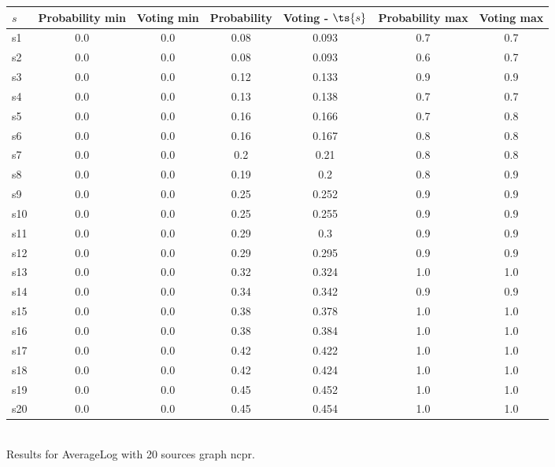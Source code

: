 \documentclass{article}
\begin{document}
\noindent\begin{tabular}{|l|c|c|c|c|c|c|}
\hline
$s$& Probability min & Voting min & Probability & Voting - $\ts{s}$ & Probability max & Voting max\\
\hline
s1 &0.0 & 0.0 & 0.08 & 0.093 & 0.7 & 0.7\\
\hline
s2 &0.0 & 0.0 & 0.08 & 0.093 & 0.6 & 0.7\\
\hline
s3 &0.0 & 0.0 & 0.12 & 0.133 & 0.9 & 0.9\\
\hline
s4 &0.0 & 0.0 & 0.13 & 0.138 & 0.7 & 0.7\\
\hline
s5 &0.0 & 0.0 & 0.16 & 0.166 & 0.7 & 0.8\\
\hline
s6 &0.0 & 0.0 & 0.16 & 0.167 & 0.8 & 0.8\\
\hline
s7 &0.0 & 0.0 & 0.2 & 0.21 & 0.8 & 0.8\\
\hline
s8 &0.0 & 0.0 & 0.19 & 0.2 & 0.8 & 0.9\\
\hline
s9 &0.0 & 0.0 & 0.25 & 0.252 & 0.9 & 0.9\\
\hline
s10 &0.0 & 0.0 & 0.25 & 0.255 & 0.9 & 0.9\\
\hline
s11 &0.0 & 0.0 & 0.29 & 0.3 & 0.9 & 0.9\\
\hline
s12 &0.0 & 0.0 & 0.29 & 0.295 & 0.9 & 0.9\\
\hline
s13 &0.0 & 0.0 & 0.32 & 0.324 & 1.0 & 1.0\\
\hline
s14 &0.0 & 0.0 & 0.34 & 0.342 & 0.9 & 0.9\\
\hline
s15 &0.0 & 0.0 & 0.38 & 0.378 & 1.0 & 1.0\\
\hline
s16 &0.0 & 0.0 & 0.38 & 0.384 & 1.0 & 1.0\\
\hline
s17 &0.0 & 0.0 & 0.42 & 0.422 & 1.0 & 1.0\\
\hline
s18 &0.0 & 0.0 & 0.42 & 0.424 & 1.0 & 1.0\\
\hline
s19 &0.0 & 0.0 & 0.45 & 0.452 & 1.0 & 1.0\\
\hline
s20 &0.0 & 0.0 & 0.45 & 0.454 & 1.0 & 1.0\\
\hline
\end{tabular}\\

\noindent Results for AverageLog with 20 sources graph ncpr.
\end{document}

